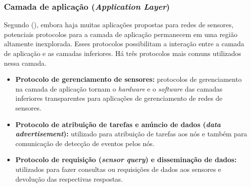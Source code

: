  \subsubsection{Camada de aplicação (\emph{Application Layer})}
 \label{sec:applicationLayer}
 
 Segundo  (\citeyear{Akyildiz2002}), embora haja muitas aplicações propostas para redes de sensores, potenciais protocolos para a camada de aplicação permanecem em uma região altamente inexplorada. Esses protocolos possibilitam a interação entre a camada de aplicação e as camadas inferiores. Há três protocolos mais comuns utilizados nessa camada. 
 
 \begin{itemize}
 \item \textbf{Protocolo de gerenciamento de sensores:} protocolos de gerenciamento na camada de aplicação tornam o \textit{hardware} e o \textit{software} das camadas inferiores transparentes para aplicações de gerenciamento de redes de sensores.
 \item \textbf{Protocolo de atribuição de tarefas e anúncio de dados (\textit{data advertisement}):} utilizado para atribuição de tarefas aos nós e também para comunicação de detecção de eventos pelos nós.
 \item \textbf{Protocolo de requisição (\textit{sensor query}) e disseminação de dados:} utilizados para fazer consultas ou requisições de dados aos sensores e devolução das respectivas respostas.
 \end{itemize}